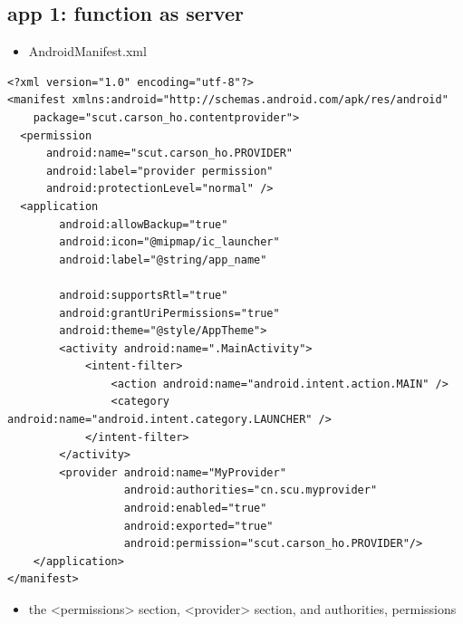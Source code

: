 \documentclass[9pt, b5paaper]{book}
\begin{document}
\subsection{app 1: function as server}
\label{sec-5-9-1}
\begin{itemize}
\item AndroidManifest.xml
\end{itemize}
\begin{verbatim}
<?xml version="1.0" encoding="utf-8"?>
<manifest xmlns:android="http://schemas.android.com/apk/res/android"
    package="scut.carson_ho.contentprovider">
  <permission
      android:name="scut.carson_ho.PROVIDER"
      android:label="provider permission"
      android:protectionLevel="normal" />
  <application
        android:allowBackup="true"
        android:icon="@mipmap/ic_launcher"
        android:label="@string/app_name"
        
        android:supportsRtl="true"
        android:grantUriPermissions="true"
        android:theme="@style/AppTheme">
        <activity android:name=".MainActivity">
            <intent-filter>
                <action android:name="android.intent.action.MAIN" />
                <category android:name="android.intent.category.LAUNCHER" />
            </intent-filter>
        </activity>
        <provider android:name="MyProvider"
                  android:authorities="cn.scu.myprovider"
                  android:enabled="true"
                  android:exported="true"
                  android:permission="scut.carson_ho.PROVIDER"/>
    </application>
</manifest>
\end{verbatim}
\begin{itemize}
\item the <permissions> section, <provider> section, and authorities, permissions
\end{itemize}
\end{document}
